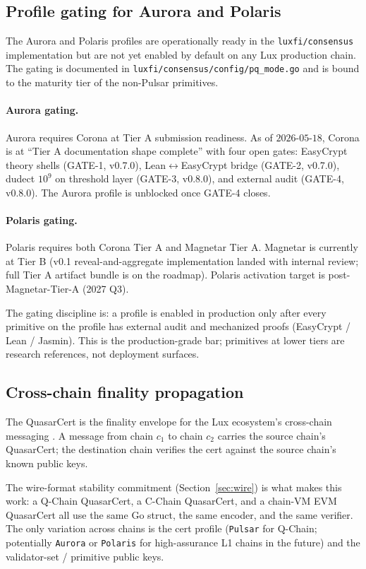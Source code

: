 \subsection{Profile gating for Aurora and Polaris}

The Aurora and Polaris profiles are operationally ready in the
\texttt{luxfi/consensus} implementation but are not yet enabled by
default on any Lux production chain. The gating is documented in
\texttt{luxfi/consensus/config/pq\_mode.go} and is bound to the
maturity tier of the non-Pulsar primitives.

\paragraph{Aurora gating.}
Aurora requires Corona at Tier A submission readiness. As of
$2026$-$05$-$18$, Corona is at ``Tier A documentation shape
complete'' with four open gates: EasyCrypt theory shells (GATE-1,
v0.7.0), Lean$\leftrightarrow$EasyCrypt bridge (GATE-2, v0.7.0),
dudect $10^9$ on threshold layer (GATE-3, v0.8.0), and external
audit (GATE-4, v0.8.0). The Aurora profile is unblocked once GATE-4
closes.

\paragraph{Polaris gating.}
Polaris requires both Corona Tier A and Magnetar Tier A. Magnetar
is currently at Tier B (v0.1 reveal-and-aggregate implementation
landed with internal review; full Tier A artifact bundle is on the
roadmap). Polaris activation target is post-Magnetar-Tier-A
(2027 Q3).

The gating discipline is: a profile is enabled in production only
after every primitive on the profile has external audit and
mechanized proofs (EasyCrypt / Lean / Jasmin). This is the
production-grade bar; primitives at lower tiers are research
references, not deployment surfaces.

\subsection{Cross-chain finality propagation}

The QuasarCert is the finality envelope for the Lux ecosystem's
cross-chain messaging \cite{lp075}. A message from chain $c_1$ to
chain $c_2$ carries the source chain's QuasarCert; the destination
chain verifies the cert against the source chain's known public
keys.

The wire-format stability commitment (Section~\ref{sec:wire})
is what makes this work: a Q-Chain QuasarCert, a C-Chain
QuasarCert, and a chain-VM EVM QuasarCert all use the same Go struct,
the same encoder, and the same verifier. The only variation across
chains is the cert profile (\texttt{Pulsar} for Q-Chain;
potentially \texttt{Aurora} or \texttt{Polaris} for high-assurance
L1 chains in the future) and the validator-set / primitive public
keys.

